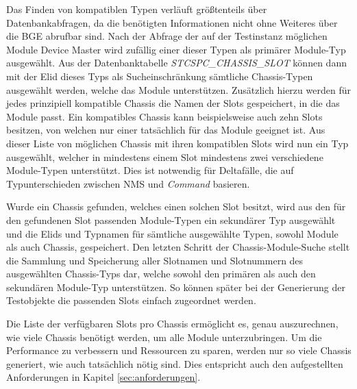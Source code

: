 Das Finden von kompatiblen Typen verläuft größtenteils über Datenbankabfragen, da die benötigten Informationen nicht ohne Weiteres über die \ac{BGE} abrufbar sind. Nach der Abfrage der auf der Testinstanz möglichen Module Device Master wird zufällig einer dieser Typen als primärer Module-Typ ausgewählt. Aus der Datenbanktabelle \textit{STCSPC\_CHASSIS\_SLOT} können dann mit der \ac{Elid} dieses Typs als Sucheinschränkung sämtliche Chassis-Typen ausgewählt werden, welche das Module unterstützen. Zusätzlich hierzu werden für jedes prinzipiell kompatible Chassis die Namen der Slots gespeichert, in die das Module passt. Ein kompatibles Chassis kann beispielsweise auch zehn Slots besitzen, von welchen nur einer tatsächlich für das Module geeignet ist. Aus dieser Liste von möglichen Chassis mit ihren kompatiblen Slots wird nun ein Typ ausgewählt, welcher in mindestens einem Slot mindestens zwei verschiedene Module-Typen unterstützt. Dies ist notwendig für Deltafälle, die auf Typunterschieden zwischen \ac{NMS} und \textit{Command} basieren.

Wurde ein Chassis gefunden, welches einen solchen Slot besitzt, wird aus den für den gefundenen Slot passenden Module-Typen ein sekundärer Typ ausgewählt und die \ac{Elid}s und Typnamen für sämtliche ausgewählte Typen, sowohl Module als auch Chassis, gespeichert. Den letzten Schritt der Chassis-Module-Suche stellt die Sammlung und Speicherung aller Slotnamen und Slotnummern des ausgewählten Chassis-Typs dar, welche sowohl den primären als auch den sekundären Module-Typ unterstützen. So können später bei der Generierung der Testobjekte die passenden Slots einfach zugeordnet werden.

Die Liste der verfügbaren Slots pro Chassis ermöglicht es, genau auszurechnen, wie viele Chassis benötigt werden, um alle Module unterzubringen. Um die Performance zu verbessern und Ressourcen zu sparen, werden nur so viele Chassis generiert, wie auch tatsächlich nötig sind. Dies entspricht auch den aufgestellten Anforderungen in Kapitel \ref{sec:anforderungen}.

